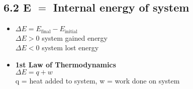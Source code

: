 \subsection{6.2 E $=$ Internal energy of system}
    \begin{itemize}
        \item $\Delta E = E_\text{final} - E_\text{initial}$\\
            $\Delta E > 0$ system gained energy\\
            $\Delta E < 0$ system lost energy
        \item \textbf{1st Law of Thermodynamics}\\
            $\Delta E = q + w$\\ 
            q = heat added to system, w = work done on system
    \end{itemize}
